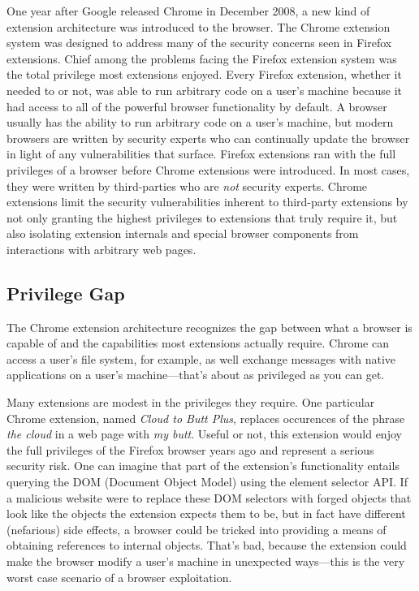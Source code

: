\documentclass[a4paper, 11pt]{article} %
\begin{document}
One year after Google released Chrome in December 2008, a new kind of extension architecture was introduced to the browser. The Chrome extension system was designed to address many of the security concerns seen in Firefox extensions. Chief among the problems facing the Firefox extension system was the total privilege most extensions enjoyed. Every Firefox extension, whether it needed to or not, was able to run arbitrary code on a user's machine because it had access to all of the powerful browser functionality by default. \cite{38394} A browser usually has the ability to run arbitrary code on a user's machine, but modern browsers are written by security experts who can continually update the browser in light of any vulnerabilities that surface. \cite{34924} Firefox extensions ran with the full privileges of a browser before Chrome extensions were introduced. In most cases, they were written by third-parties who are \textit{not} security experts. Chrome extensions limit the security vulnerabilities inherent to third-party extensions by not only granting the highest privileges to extensions that truly require it, but also isolating extension internals and special browser components from interactions with arbitrary web pages.

\subsection{Privilege Gap}
The Chrome extension architecture recognizes the gap between what a browser is capable of and the capabilities most extensions actually require. Chrome can access a user's file system, for example, as well exchange messages with native applications on a user's machine---that's about as privileged as you can get. \cite{38394}

Many extensions are modest in the privileges they require. One particular Chrome extension, named \textit{Cloud to Butt Plus}, replaces occurences of the phrase \textit{the cloud} in a web page with \textit{my butt}. \cite{Cloud45:online} Useful or not, this extension would enjoy the full privileges of the Firefox browser years ago and represent a serious security risk. One can imagine that part of the extension's functionality entails querying the DOM (Document Object Model) using the element selector API. If a malicious website were to replace these DOM selectors with forged objects that look like the objects the extension expects them to be, but in fact have different (nefarious) side effects, a browser could be tricked into providing a means of obtaining references to internal objects. That's bad, because the extension could make the browser modify a user's machine in unexpected ways---this is the very worst case scenario of a browser exploitation.
\end{document}
